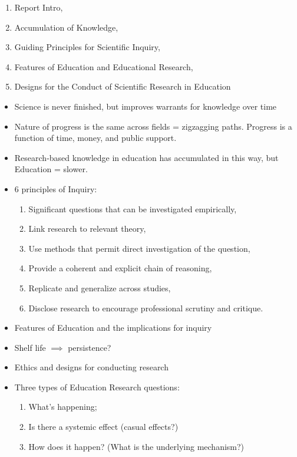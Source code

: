 \documentclass{TC}
\begin{document}
\begin{enumerate}[CH 1:]
\item Report Intro,
\item Accumulation of Knowledge,
\item Guiding Principles for Scientific Inquiry,
\item Features of Education and Educational Research,
\item Designs for the Conduct of Scientific Research in Education
\end{enumerate}
		\begin{itemize}
		\item Science is never finished, but improves warrants for knowledge over time
		\item Nature of progress is the same across fields = zigzagging paths. Progress is a function of time, money, and public support.
		\item Research-based knowledge in education has accumulated in this way, but Education = slower.
		\item 6 principles of Inquiry:
			\begin{enumerate}
			\item Significant questions that can be investigated empirically,
			\item Link research to relevant theory,
			\item Use methods that permit direct investigation of the question,
			\item Provide a coherent and explicit chain of reasoning,
			\item Replicate and generalize across studies,
			\item Disclose research to encourage professional scrutiny and critique. 
			\end{enumerate}
		\item Features of Education and the implications for inquiry
		\item Shelf life $\implies$ persistence?
		\item Ethics and designs for conducting research
		\item Three types of Education Research questions:
			\begin{enumerate}
			\item What's happening;
			\item Is there a systemic effect (casual effects?)
			\item How does it happen? (What is the underlying mechanism?)
			\end{enumerate}
		\end{itemize}
\end{document}
